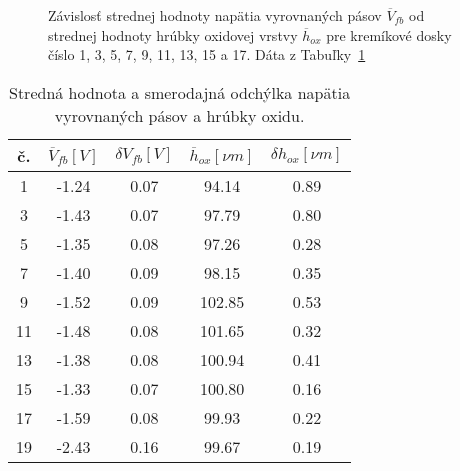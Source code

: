 \newpage
\begin{figure}[h!]\centering
  \begin{minipage}[c]{\myfiguresize}
    \begin{center}
      
    \end{center}
    \caption[Závislosť strednej hodnoty $\overline V_{fb}$ od strednej
      hodnoty hrúbky oxidovej vrstvy $\overline h_{ox}$]{Závislosť
      strednej hodnoty napätia vyrovnaných pásov $\overline V_{fb}$ od
      strednej hodnoty hrúbky oxidovej vrstvy $\overline h_{ox}$ pre
      kremíkové dosky číslo 1, 3, 5, 7, 9, 11, 13, 15 a 17. Dáta z
      Tabuľky~\ref{tab:7.4}}\label{fig:7.6}
  \end{minipage}
\end{figure}

\begin{table}[h!]\centering
  \begin{minipage}[c]{\myfiguresize}
    \begin{center}
      \begin{tabular}{c c c c c}
        č. & $\overline V_{fb} [V]$ & $\delta V_{fb} [V]$ & $\overline h_{ox} [\nu{m}]$ & $\delta h_{ox} [\nu{m}]$\\ 
        \hline
         1 & -1.24 & 0.07 &  94.14 & 0.89\\
         3 & -1.43 & 0.07 &  97.79 & 0.80\\
         5 & -1.35 & 0.08 &  97.26 & 0.28\\
         7 & -1.40 & 0.09 &  98.15 & 0.35\\
         9 & -1.52 & 0.09 & 102.85 & 0.53\\
        11 & -1.48 & 0.08 & 101.65 & 0.32\\
        13 & -1.38 & 0.08 & 100.94 & 0.41\\
        15 & -1.33 & 0.07 & 100.80 & 0.16\\
        17 & -1.59 & 0.08 &  99.93 & 0.22\\
        19 & -2.43 & 0.16 &  99.67 & 0.19\\
      \end{tabular}
    \end{center}
    \caption[Stredná hodnota a smerodajná odchýlka napätia vyrovnaných
      pásov a hrúbky oxidu]{Stredná hodnota a smerodajná odchýlka
      napätia vyrovnaných pásov a hrúbky oxidu.}\label{tab:7.4}
  \end{minipage}
\end{table}

